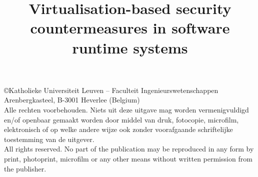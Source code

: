 %




\title{Virtualisation-based security countermeasures in software runtime systems}
\sidetitle{}





\pagestyle{empty}
\newpage
\section*{}

\vspace*{13cm}

\copyright  Katholieke Universiteit Leuven -- Faculteit Ingenieurswetenschappen\\
Arenbergkasteel, B-3001 Heverlee (Belgium)\\

\noindent
Alle rechten voorbehouden. Niets uit deze uitgave mag worden
ver\-menig\-vuldigd en/of open\-baar gemaakt worden door middel van druk,
fotocopie, microfilm, elektronisch of op welke andere wijze ook zonder
voorafgaande schriftelijke toe\-stemming van de uitgever.\\

\noindent
All rights reserved. No part of the publication may be reproduced in
any form by print, photoprint, microfilm or any other means without
written permission from the publisher.

